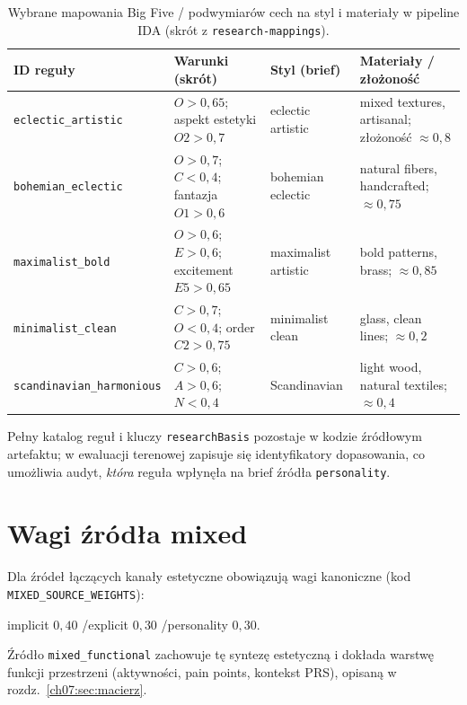 \begin{table}[htbp]
  \centering
  \caption{Wybrane mapowania Big Five / podwymiarów cech na styl i materiały w pipeline IDA (skrót z \texttt{research-mappings}).}
  \label{tab:app:c:mappings}
  \footnotesize\setlength{\tabcolsep}{4pt}\begin{tabular}{@{}>{\raggedright\arraybackslash}p{}>{\raggedright\arraybackslash}p{}>{\raggedright\arraybackslash}p{}>{\raggedright\arraybackslash}p{}@{}}
    \toprule
    ID reguły & Warunki (skrót) & Styl (brief) & Materiały / złożoność \\
    \midrule
    \texttt{eclectic\_artistic} &
    $O>0{,}65$; aspekt estetyki $O2>0{,}7$ &
    eclectic artistic &
    mixed textures, artisanal; złożoność $\approx 0{,}8$ \\
    \addlinespace
    \texttt{bohemian\_eclectic} &
    $O>0{,}7$; $C<0{,}4$; fantazja $O1>0{,}6$ &
    bohemian eclectic &
    natural fibers, handcrafted; $\approx 0{,}75$ \\
    \addlinespace
    \texttt{maximalist\_bold} &
    $O>0{,}6$; $E>0{,}6$; excitement $E5>0{,}65$ &
    maximalist artistic &
    bold patterns, brass; $\approx 0{,}85$ \\
    \addlinespace
    \texttt{minimalist\_clean} &
    $C>0{,}7$; $O<0{,}4$; order $C2>0{,}75$ &
    minimalist clean &
    glass, clean lines; $\approx 0{,}2$ \\
    \addlinespace
    \texttt{scandinavian\_harmonious} &
    $C>0{,}6$; $A>0{,}6$; $N<0{,}4$ &
    Scandinavian &
    light wood, natural textiles; $\approx 0{,}4$ \\
    \bottomrule
  \end{tabular}
\end{table}

Pełny katalog reguł i kluczy \texttt{researchBasis} pozostaje w kodzie źródłowym artefaktu; w ewaluacji terenowej zapisuje się identyfikatory dopasowania, co umożliwia audyt, \emph{która} reguła wpłynęła na brief źródła \texttt{personality}.

\section{Wagi źródła mixed}
\label{app:c:sec:wagi}

Dla źródeł łączących kanały estetyczne obowiązują wagi kanoniczne (kod \texttt{MIXED\_SOURCE\_WEIGHTS}):

\begin{center}
implicit $0{,}40$ \quad/\quad explicit $0{,}30$ \quad/\quad personality $0{,}30$.
\end{center}

Źródło \texttt{mixed\_functional} zachowuje tę syntezę estetyczną i dokłada warstwę funkcji przestrzeni (aktywności, pain points, kontekst PRS), opisaną w rozdz.~\ref{ch07:sec:macierz}.
